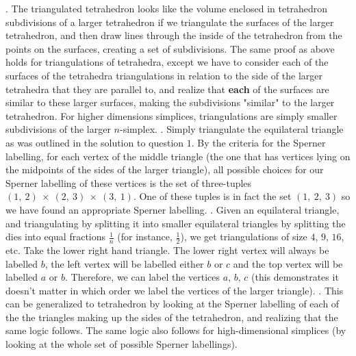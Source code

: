 \documentclass{article}
\begin{document}
\newline{}. The triangulated tetrahedron looks like the volume enclosed in tetrahedron subdivisions of a larger tetrahedron if we triangulate the surfaces of the larger tetrahedron, and then draw lines through the inside of the tetrahedron from the points on the surfaces, creating a set of subdivisions. The same proof as above holds for triangulations of tetrahedra, except we have to consider each of the surfaces of the tetrahedra triangulations in relation to the side of the larger tetrahedra that they are parallel to, and realize that \textbf{each} of the surfaces are similar to these larger surfaces, making the subdivisions "similar" to the larger tetrahedron. For higher dimensions simplices, triangulations are simply smaller subdivisions of the larger $n$-simplex.
\newline{}. Simply triangulate the equilateral triangle as was outlined in the solution to question $1$. By the criteria for the Sperner labelling, for each vertex of the middle triangle (the one that has vertices lying on the midpoints of the sides of the larger triangle), all possible choices for our Sperner labelling of these vertices is the set of three-tuples ${(1, \ 2) \ \times \ (2, \ 3) \ \times \ (3, \ 1)}$. One of these tuples is in fact the set $(1, \ 2, \ 3)$ so we have found an appropriate Sperner labelling.
\newline{}. Given an equilateral triangle, and triangulating by splitting it into smaller equilateral triangles by splitting the dies into equal fractions $\frac{1}{n}$ (for instance, $\frac{1}{2}$), we get triangulations of size $4$, $9$, $16$, etc. Take the lower right hand triangle. The lower right vertex will always be labelled $b$, the left vertex will be labelled either $b$ or $c$ and the top vertex will be labelled $a$ or $b$. Therefore, we can label the vertices $a$, $b$, $c$ (this demonstrates it doesn't matter in which order we label the vertices of the larger triangle).
\newline{}. This can be generalized to tetrahedron by looking at the Sperner labelling of each of the the triangles making up the sides of the tetrahedron, and realizing that the same logic follows. The same logic also follows for high-dimensional simplices (by looking at the whole set of possible Sperner labellings).
\newline\newline
\end{document}

